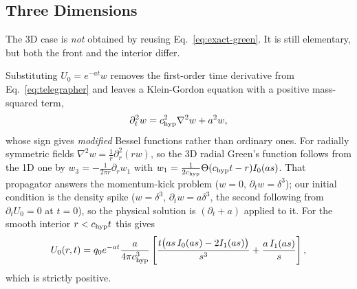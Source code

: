 \documentclass[11pt, a4paper, parskip]{scrartcl}
\theoremstyle{plain}
\theoremstyle{definition}
\theoremstyle{remark}
\newcommand{\chyp}{c_{\rm hyp}}                           %
\begin{document}
\subsection{Three Dimensions}
\label{sec:exact-3d}

The 3D case is \emph{not} obtained by reusing Eq.~\eqref{eq:exact-green}.
It is still elementary, but both the front and the interior differ.

Substituting $U_0=e^{-at}w$ removes the first-order time derivative from
Eq.~\eqref{eq:telegrapher} and leaves a Klein-Gordon equation with a
positive mass-squared term,
\begin{equation}
  \label{eq:kg}
  \partial_t^2w = \chyp^2\nabla^2w + a^2w ,
\end{equation}
whose sign gives \emph{modified} Bessel functions rather than ordinary
ones. For radially symmetric fields $\nabla^2w=\tfrac1r\partial_r^2(rw)$,
so the 3D radial Green's function follows from the 1D one by
$w_3=-\tfrac{1}{2\pi r}\partial_rw_1$ with
$w_1=\tfrac{1}{2\chyp}\Theta(\chyp t-r)I_0(as)$. That propagator answers
the momentum-kick problem ($w=0$, $\partial_tw=\delta^3$); our initial
condition is the density spike ($w=\delta^3$, $\partial_tw=a\delta^3$,
the second following from $\partial_tU_0=0$ at $t=0$), so the physical
solution is $(\partial_t+a)$ applied to it. For the smooth interior $r<\chyp t$ this
gives
\begin{equation}
  \label{eq:U3d-smooth}
  U_0(r,t) = q_0e^{-at}\frac{a}{4\pi\chyp^3}\left[
    \frac{t\big(as\,I_0(as)-2I_1(as)\big)}{s^3}
    + \frac{a\,I_1(as)}{s}\right] ,
\end{equation}
which is strictly positive.
\end{document}
